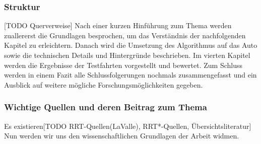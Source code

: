 \subsubsection{Struktur}
[TODO Querverweise]
Nach einer kurzen Hinführung zum Thema werden zuallererst die Grundlagen besprochen, um das Verständnis der nachfolgenden Kapitel zu erleichtern. Danach wird die Umsetzung des Algorithmus auf das Auto sowie die technischen Details und Hintergründe beschrieben. Im vierten Kapitel werden die Ergebnisse der Testfahrten vorgestellt und bewertet. Zum Schluss werden in einem Fazit alle Schlussfolgerungen nochmals zusammengefasst und ein Ausblick auf weitere mögliche Forschungsmöglichkeiten gegeben.

\subsubsection{Wichtige Quellen und deren Beitrag zum Thema}
Es existieren[TODO RRT-Quellen(LaValle), RRT*-Quellen, Übersichtsliteratur]
\\
Nun werden wir uns den wissenschaftlichen Grundlagen der Arbeit widmen.

